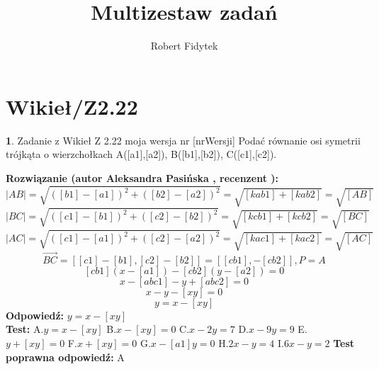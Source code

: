 \documentclass[12pt, a4paper]{article}
\title{Multizestaw zadań}
\author{Robert Fidytek}
\date{}
\theoremstyle{definition} %
\newtheorem{zad}{}
\newcommand{\kategoria}[1]{\section{#1}} %
\newcommand{\zadStart}[1]{\begin{zad}#1\newline} %
\newcommand{\zadStop}{\end{zad}}   %
\newcommand{\rozwStart}[2]{\noindent \textbf{Rozwiązanie (autor #1 , recenzent #2): }\newline} %
\newcommand{\rozwStop}{\newline}                                            %
\newcommand{\odpStart}{\noindent \textbf{Odpowiedź:}\newline}    %
\newcommand{\odpStop}{\newline}                                             %
\newcommand{\testStart}{\noindent \textbf{Test:}\newline} %
\newcommand{\testStop}{\newline} %
\newcommand{\kluczStart}{\noindent \textbf{Test poprawna odpowiedź:}\newline} %
\newcommand{\kluczStop}{\newline} %
\begin{document}
\maketitle


\kategoria{Wikieł/Z2.22}
\zadStart{Zadanie z Wikieł Z 2.22 moja wersja nr [nrWersji]}
Podać równanie osi symetrii trójkąta o wierzchołkach A([a1],[a2]), B([b1],[b2]), C([c1],[c2]).
\zadStop
\rozwStart{Aleksandra Pasińska}{}
$$|AB|=\sqrt{([b1]-[a1])^2+([b2]-[a2])^2}=\sqrt{[kab1]+[kab2]}=\sqrt{[AB]}$$
$$|BC|=\sqrt{([c1]-[b1])^2+([c2]-[b2])^2}=\sqrt{[kcb1]+[kcb2]}=\sqrt{[BC]}$$
$$|AC|=\sqrt{([c1]-[a1])^2+([c2]-[a2])^2}=\sqrt{[kac1]+[kac2]}=\sqrt{[AC]}$$
$$\overrightarrow{BC}=[[c1]-[b1],[c2]-[b2]]=[[cb1],-[cb2]],P=A$$
$$[cb1](x-[a1])-[cb2](y-[a2])=0$$
$$x-[abc1]-y+[abc2]=0$$
$$x-y-[xy]=0$$
$$y=x-[xy]$$
\rozwStop
\odpStart
$y=x-[xy]$\\
\odpStop
\testStart
A.$y=x-[xy]$
B.$x-[xy]=0$
C.$x-2y=7$
D.$x-9y=9$
E.$y+[xy]=0$
F.$x+[xy]=0$
G.$x-[a1]y=0$
H.$2x-y=4$
I.$6x-y=2$
\testStop
\kluczStart
A
\kluczStop
\end{document}
